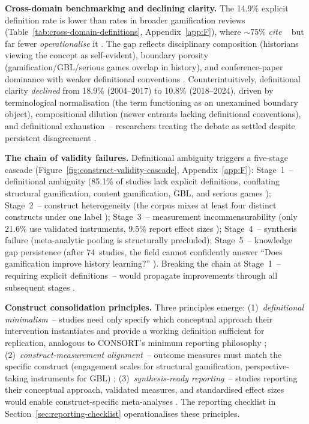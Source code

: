 \textbf{Cross-domain benchmarking and declining clarity.} \label{sec:cross-domain-def} The 14.9\% explicit definition rate is lower than rates in broader gamification reviews (Table~\ref{tab:cross-domain-definitions}, Appendix~\ref{app:F}), where $\sim$75\% \emph{cite} \citeauthor{Deterding2011}~\cite{Deterding2011} but far fewer \emph{operationalise} it \cite{Hamari2014, KoivistoHamari2019, SEABORN201514}. The gap reflects disciplinary composition (historians viewing the concept as self-evident), boundary porosity (gamification/GBL/serious games overlap in history), and conference-paper dominance with weaker definitional conventions \cite{Buckley2018, HuotariHamari2017, Korniienko2025mrqs}. Counterintuitively, definitional clarity \emph{declined} from 18.9\% (2004--2017) to 10.8\% (2018--2024), driven by terminological normalisation (the term functioning as an unexamined boundary object), compositional dilution (newer entrants lacking definitional conventions), and definitional exhaustion~-- researchers treating the debate as settled despite persistent disagreement \cite{Landers2019, Cronbach1955}.

\textbf{The chain of validity failures.} \label{sec:validity-chain} Definitional ambiguity triggers a five-stage cascade (Figure~\ref{fig:construct-validity-cascade}, Appendix~\ref{app:F}): Stage~1~-- definitional ambiguity (85.1\% of studies lack explicit definitions, conflating structural gamification, content gamification, GBL, and serious games \cite{Deterding2011, Becker2021}); Stage~2~-- construct heterogeneity (the corpus mixes at least four distinct constructs under one label \cite{Buckley2018, DichevDicheva2017}); Stage~3~-- measurement incommensurability (only 21.6\% use validated instruments, 9.5\% report effect sizes \cite{Korniienko2025mrqs, Borenstein2009}); Stage~4~-- synthesis failure (meta-analytic pooling is structurally precluded); Stage~5~-- knowledge gap persistence (after 74~studies, the field cannot confidently answer ``Does gamification improve history learning?'' \cite{Landers2019, Cronbach1955}). Breaking the chain at Stage~1~-- requiring explicit definitions~-- would propagate improvements through all subsequent stages \cite{KorniienkoSemerikov2024}.

\textbf{Construct consolidation principles.} \label{sec:construct-consolidation} Three principles emerge: (1)~\emph{definitional minimalism}~-- studies need only specify which conceptual approach their intervention instantiates and provide a working definition sufficient for replication, analogous to CONSORT's minimum reporting philosophy \cite{Schulz2010CONSORT, Landers2019}; (2)~\emph{construct-measurement alignment}~-- outcome measures must match the specific construct (engagement scales for structural gamification, perspective-taking instruments for GBL) \cite{Borenstein2009, 36Scholz2021}; (3)~\emph{synthesis-ready reporting}~-- studies reporting their conceptual approach, validated measures, and standardised effect sizes would enable construct-specific meta-analyses \cite{HuotariHamari2017, Korniienko2025mrqs}. The reporting checklist in Section~\ref{sec:reporting-checklist} operationalises these principles.

